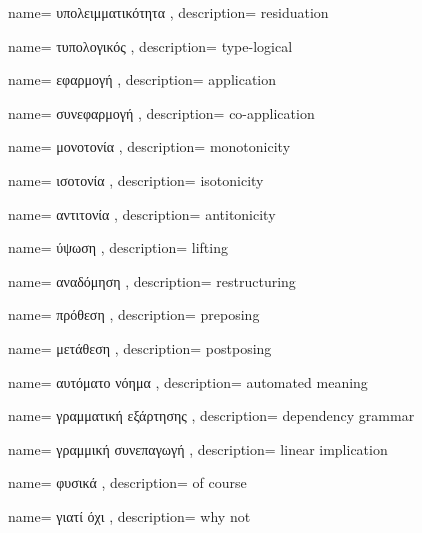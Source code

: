 {name={
υπολειμματικότητα
},
description={
residuation
}}

{name={
τυπολογικός
},
description={
type-logical
}}

{name={
εφαρμογή
},
description={
application
}}

{name={
συνεφαρμογή
},
description={
co-application
}}

{name={
μονοτονία
},
description={
monotonicity
}}

{name={
ισοτονία
},
description={
isotonicity
}}

{name={
αντιτονία
},
description={
antitonicity
}}

{name={
ύψωση
},
description={
lifting
}}

{name={
αναδόμηση
},
description={
restructuring
}}

{name={
πρόθεση
},
description={
preposing
}}

{name={
μετάθεση
},
description={
postposing
}}

{name={
αυτόματο νόημα
},
description={
automated meaning
}}

{name={
γραμματική εξάρτησης
},
description={
dependency grammar
}}

{name={
γραμμική συνεπαγωγή
},
description={
linear implication
}}

{name={
φυσικά
},
description={
of course
}}

{name={
γιατί όχι
},
description={
why not
}}

